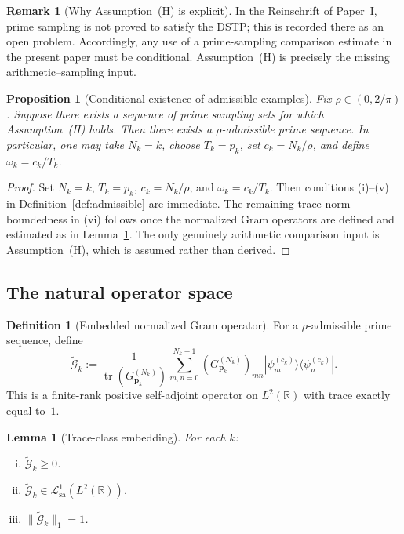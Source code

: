 \documentclass[12pt,a4paper]{amsart}
\newtheorem{lemma}[theorem]{Lemma}
\newtheorem{proposition}[theorem]{Proposition}
\theoremstyle{definition}
\newtheorem{definition}[theorem]{Definition}
\newtheorem{remark}[theorem]{Remark}
\newcommand{\GVMk}{G^{(N_k)}_{\mathbf{p}_k}}
\newcommand{\norm}[1]{\|#1\|}
\newcommand{\Lcal}{\mathcal{L}^1_{\mathrm{sa}}}
\begin{document}
\begin{remark}[Why Assumption~\textup{(H)} is explicit]
In the Reinschrift of Paper~I, prime sampling is not proved to satisfy the DSTP;
this is recorded there as an open problem.
Accordingly, any use of a prime-sampling comparison estimate in the present paper
must be conditional.
Assumption~\textup{(H)} is precisely the missing arithmetic--sampling input.
\end{remark}

\begin{proposition}[Conditional existence of admissible examples]
\label{prop:admissible_exist}
Fix $\rho\in(0,2/\pi)$. Suppose there exists a sequence of prime sampling sets for which
Assumption~\textup{(H)} holds. Then there exists a $\rho$-admissible prime sequence.
In particular, one may take $N_k=k$, choose $T_k=p_k$, set $c_k=N_k/\rho$, and define
$\omega_k=c_k/T_k$.
\end{proposition}

\begin{proof}
Set $N_k=k$, $T_k=p_k$, $c_k=N_k/\rho$, and $\omega_k=c_k/T_k$.
Then conditions (i)--(v) in Definition~\ref{def:admissible} are immediate.
The remaining trace-norm boundedness in (vi) follows once the normalized Gram operators
are defined and estimated as in Lemma~\ref{lem:embed}.
The only genuinely arithmetic comparison input is Assumption~\textup{(H)},
which is assumed rather than derived.
\end{proof}

\subsection{The natural operator space}

\begin{definition}[Embedded normalized Gram operator]\label{def:embed}
For a $\rho$-admissible prime sequence, define
\[
  \widetilde{\mathcal G}_k
  :=
  \frac{1}{\operatorname{tr}(\GVMk)}
  \sum_{m,n=0}^{N_k-1}(\GVMk)_{mn}
  |\psi_m^{(c_k)}\rangle\langle\psi_n^{(c_k)}|.
\]
This is a finite-rank positive self-adjoint operator on $L^2(\mathbb R)$
with trace exactly equal to~$1$.
\end{definition}

\begin{lemma}[Trace-class embedding]\label{lem:embed}
For each $k$:
\begin{enumerate}[(i)]
\item $\widetilde{\mathcal G}_k\ge0$.
\item $\widetilde{\mathcal G}_k\in\Lcal(L^2(\mathbb R))$.
\item $\norm{\widetilde{\mathcal G}_k}_1=1$.
\end{enumerate}
\end{lemma}
\end{document}
